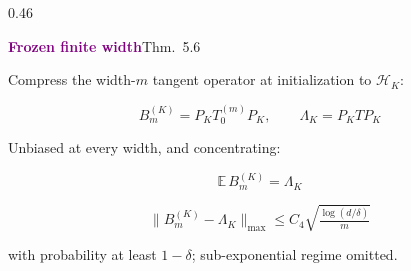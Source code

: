 \documentclass[aspectratio=169,9pt]{beamer}
\begin{document}
\begin{frame}[noframenumbering]
\begin{columns}[T,onlytextwidth]
\begin{column}{0.46\textwidth}
			\begin{purplecard}
				{\textcolor{purple}{\bfseries Frozen finite width}\hfill{\tiny\textcolor{muted}{Thm.~5.6}}}\par\vspace{1mm}
				{\scriptsize Compress the width-$m$ tangent operator at initialization to $\mathcal H_K$:}\par\vspace{-1.5mm}
				{\scriptsize
				\[
					B_m^{(K)}=P_K T_0^{(m)} P_K,
					\qquad
					\Lambda_K=P_K T P_K
				\]
				}
				\vspace{-3.5mm}\par
				{\scriptsize Unbiased at every width, and concentrating:}\par\vspace{-1.5mm}
				{\scriptsize
				\[
					\mathbb{E}\,B_m^{(K)}=\Lambda_K
				\]
				}
				\vspace{-4mm}\par
				{\scriptsize
				\[
					\|B_m^{(K)}-\Lambda_K\|_{\max}
					\le
					C_4\sqrt{\tfrac{\log(d/\delta)}{m}}
				\]
				}
				\vspace{-2.5mm}\par
				{\tiny\textcolor{muted}{with probability at least $1-\delta$; sub-exponential regime omitted.}}
			\end{purplecard}
		\end{column}
	\end{columns}
\end{frame}
\end{document}
